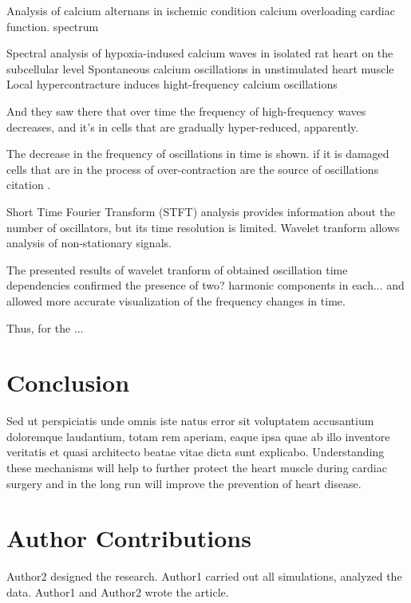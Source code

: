 \documentclass{biophys-new}
\begin{document}

Analysis of calcium alternans in ischemic condition
calcium overloading
cardiac function.
spectrum

Spectral analysis of hypoxia-indused calcium waves in isolated rat heart on the subcellular level
Spontaneous calcium oscillations in unstimulated heart muscle
Local hypercontracture induces hight-frequency calcium oscillations

And they saw there that over time the frequency of high-frequency waves decreases, and it’s in cells that are gradually hyper-reduced, apparently.

The decrease in the frequency of oscillations in time is shown.
if it is damaged cells that are in the process of over-contraction
are the source of oscillations
\cite{sato2014depolarization}
citation \cite{sato2014depolarization}.

Short Time Fourier Transform (STFT) analysis provides information about the number of oscillators, but its time resolution is limited.
Wavelet tranform allows analysis of non-stationary signals.

The presented results of wavelet tranform of obtained oscillation time dependencies confirmed the presence of two? harmonic components in each...
and allowed more accurate visualization of the frequency changes in time.

Thus, for the ...

\section*{Conclusion}
Sed ut perspiciatis unde omnis iste natus error sit voluptatem accusantium doloremque laudantium, totam rem aperiam, eaque ipsa quae ab illo inventore veritatis et quasi architecto beatae vitae dicta sunt explicabo.
Understanding these mechanisms will help to further protect the heart muscle during cardiac surgery and in the long run will improve the prevention of heart disease.

\section*{Author Contributions}
Author2 designed the research. Author1 carried out all simulations, analyzed the data. Author1 and Author2 wrote the article.
\end{document}
